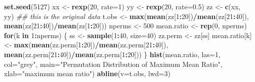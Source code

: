 \documentclass[]{book}
\newenvironment{Shaded}{\begin{snugshade}}{\end{snugshade}}
\newcommand{\CommentTok}[1]{\textcolor[rgb]{0.56,0.35,0.01}{\textit{#1}}}
\newcommand{\ControlFlowTok}[1]{\textcolor[rgb]{0.13,0.29,0.53}{\textbf{#1}}}
\newcommand{\DataTypeTok}[1]{\textcolor[rgb]{0.13,0.29,0.53}{#1}}
\newcommand{\DecValTok}[1]{\textcolor[rgb]{0.00,0.00,0.81}{#1}}
\newcommand{\FloatTok}[1]{\textcolor[rgb]{0.00,0.00,0.81}{#1}}
\newcommand{\KeywordTok}[1]{\textcolor[rgb]{0.13,0.29,0.53}{\textbf{#1}}}
\newcommand{\NormalTok}[1]{#1}
\newcommand{\OperatorTok}[1]{\textcolor[rgb]{0.81,0.36,0.00}{\textbf{#1}}}
\newcommand{\StringTok}[1]{\textcolor[rgb]{0.31,0.60,0.02}{#1}}
\begin{document}
\begin{Shaded}
\begin{Highlighting}[]
\KeywordTok{set.seed}\NormalTok{(}\DecValTok{5127}\NormalTok{)}
\NormalTok{xx <-}\StringTok{ }\KeywordTok{rexp}\NormalTok{(}\DecValTok{20}\NormalTok{, }\DataTypeTok{rate=}\DecValTok{1}\NormalTok{)}
\NormalTok{yy <-}\StringTok{ }\KeywordTok{rexp}\NormalTok{(}\DecValTok{20}\NormalTok{, }\DataTypeTok{rate=}\FloatTok{0.5}\NormalTok{)}
\NormalTok{zz <-}\StringTok{ }\KeywordTok{c}\NormalTok{(xx, yy) }\CommentTok{## this is the original data}
\NormalTok{t.obs <-}\StringTok{ }\KeywordTok{max}\NormalTok{(}\KeywordTok{mean}\NormalTok{(zz[}\DecValTok{1}\OperatorTok{:}\DecValTok{20}\NormalTok{])}\OperatorTok{/}\KeywordTok{mean}\NormalTok{(zz[}\DecValTok{21}\OperatorTok{:}\DecValTok{40}\NormalTok{]), }\KeywordTok{mean}\NormalTok{(zz[}\DecValTok{21}\OperatorTok{:}\DecValTok{40}\NormalTok{])}\OperatorTok{/}\KeywordTok{mean}\NormalTok{(zz[}\DecValTok{1}\OperatorTok{:}\DecValTok{20}\NormalTok{]))}
\NormalTok{nperms <-}\StringTok{ }\DecValTok{500}
\NormalTok{mean.ratio <-}\StringTok{ }\KeywordTok{rep}\NormalTok{(}\DecValTok{0}\NormalTok{, nperms)}
\ControlFlowTok{for}\NormalTok{(k }\ControlFlowTok{in} \DecValTok{1}\OperatorTok{:}\NormalTok{nperms) \{}
\NormalTok{     ss <-}\StringTok{ }\KeywordTok{sample}\NormalTok{(}\DecValTok{1}\OperatorTok{:}\DecValTok{40}\NormalTok{, }\DataTypeTok{size=}\DecValTok{40}\NormalTok{)}
\NormalTok{     zz.perm <-}\StringTok{ }\NormalTok{zz[ss]}
\NormalTok{     mean.ratio[k] <-}\StringTok{ }\KeywordTok{max}\NormalTok{(}\KeywordTok{mean}\NormalTok{(zz.perm[}\DecValTok{1}\OperatorTok{:}\DecValTok{20}\NormalTok{])}\OperatorTok{/}\KeywordTok{mean}\NormalTok{(zz.perm[}\DecValTok{21}\OperatorTok{:}\DecValTok{40}\NormalTok{]), }
                          \KeywordTok{mean}\NormalTok{(zz.perm[}\DecValTok{21}\OperatorTok{:}\DecValTok{40}\NormalTok{])}\OperatorTok{/}\KeywordTok{mean}\NormalTok{(zz.perm[}\DecValTok{1}\OperatorTok{:}\DecValTok{20}\NormalTok{]))}
\NormalTok{\}}
\KeywordTok{hist}\NormalTok{(mean.ratio, }\DataTypeTok{las=}\DecValTok{1}\NormalTok{, }\DataTypeTok{col=}\StringTok{"grey"}\NormalTok{, }\DataTypeTok{main=}\StringTok{"Permutation Distribution }
\StringTok{     of Maximum Mean Ratio"}\NormalTok{, }\DataTypeTok{xlab=}\StringTok{"maximum mean ratio"}\NormalTok{)}
\KeywordTok{abline}\NormalTok{(}\DataTypeTok{v=}\NormalTok{t.obs, }\DataTypeTok{lwd=}\DecValTok{3}\NormalTok{)}
\end{Highlighting}
\end{Shaded}
\end{document}
